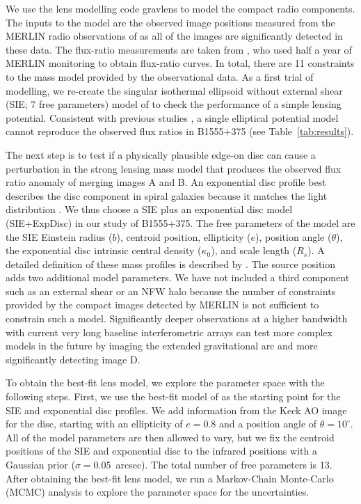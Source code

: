 \documentclass[a4paper,fleqn,usenatbib,useAMS]{mnras}
\begin{document}
We use the lens modelling code {\sc gravlens} \citep{Kee01} to model the compact radio components. The inputs to the model are the observed image positions measured from the MERLIN radio observations of \citet{Marlow99} as all of the images are significantly detected in these data. The flux-ratio measurements are taken from \citet{K03}, who used half a year of MERLIN monitoring to obtain flux-ratio curves. In total, there are 11 constraints to the mass model provided by the observational data. As a first trial of modelling, we re-create the singular isothermal ellipsoid without external shear (SIE; 7 free parameters) model of \citet{Marlow99} to check the performance of a simple lensing potential. Consistent with previous studies \citep{Marlow99,Xu15}, a single elliptical potential model cannot reproduce the observed flux ratios in B1555+375 (see Table~\ref{tab:results}). 

The next step is to test if a physically plausible edge-on disc can cause a perturbation in the strong lensing mass model that produces the observed flux ratio anomaly of  merging images A and B. An exponential disc profile best describes the disc component in spiral galaxies because it matches the light distribution \citep{Kee98}. We thus choose a SIE plus an exponential disc model (SIE+ExpDisc) in our study of B1555+375. The free parameters of the model are the SIE Einstein radius ($b$), centroid position, ellipticity ($e$), position angle ($\theta$), the exponential disc intrinsic central density ($\kappa_0$), and scale length ($R_s$). A detailed definition of these mass profiles is described by \citet{Kee01}. The source position adds two additional model parameters. We have not included a third component such as an external shear or an NFW halo because the number of constraints provided by the compact images detected by MERLIN is not sufficient to constrain such a model. Significantly deeper observations at a higher bandwidth with current very long baseline interferometric arrays can test more complex models in the future by imaging the extended gravitational arc and more significantly detecting image D. 

To obtain the best-fit lens model, we explore the parameter space with the following steps. First, we use the best-fit model of \citet{Marlow99} as the starting point for the SIE and exponential disc profiles. We add information from the Keck AO image for the disc, starting with an ellipticity of $e=0.8$ and a position angle of $\theta=10^\circ$.  All of the model parameters are then allowed to vary, but we fix the centroid positions of the SIE and exponential disc to the infrared positions with a Gaussian prior ($\sigma = 0.05 $~arcsec). The total number of free parameters is 13. After obtaining the best-fit lens model, we run a Markov-Chain Monte-Carlo (MCMC) analysis to explore the parameter space for the uncertainties.
\end{document}
